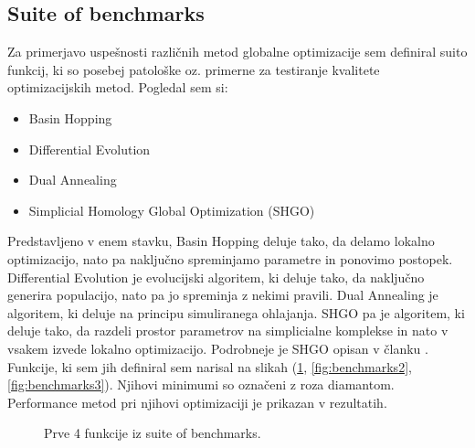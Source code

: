 \documentclass[a4paper]{article}
\begin{document}
\subsection{Suite of benchmarks}
Za primerjavo uspešnosti različnih metod globalne optimizacije sem definiral suito funkcij, ki so posebej
patološke oz. primerne za testiranje kvalitete optimizacijskih metod. Pogledal sem si:
\begin{itemize}
    \item Basin Hopping
    \item Differential Evolution
    \item Dual Annealing
    \item Simplicial Homology Global Optimization (SHGO)
\end{itemize}

Predstavljeno v enem stavku, Basin Hopping deluje tako, da delamo lokalno optimizacijo, nato pa naključno 
spreminjamo parametre in ponovimo postopek. Differential Evolution je evolucijski algoritem, ki deluje tako,
da naključno generira populacijo, nato pa jo spreminja z nekimi pravili. Dual Annealing je algoritem, ki
deluje na principu simuliranega ohlajanja. SHGO pa je algoritem, ki deluje tako, da razdeli prostor parametrov
na simplicialne komplekse in nato v vsakem izvede lokalno optimizacijo. Podrobneje je SHGO opisan v članku
\cite{Endres2018}. \\

Funkcije, ki sem jih definiral sem 
narisal na slikah (\ref{fig:benchmarks}, \ref{fig:benchmarks2}, \ref{fig:benchmarks3}). Njihovi minimumi so označeni z 
roza diamantom. Performance metod
pri njihovi optimizaciji je prikazan v rezultatih.\\

\begin{figure}[H]
    \centering
    \caption{Prve 4 funkcije iz suite of benchmarks.}
    \label{fig:benchmarks}
\end{figure}
\end{document}
